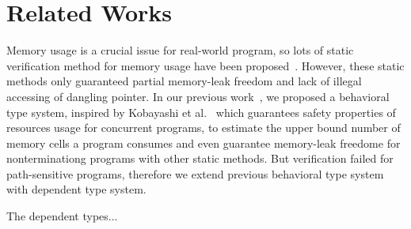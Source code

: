 \section{Related Works}\label{sec:relatedwork}

Memory usage is a crucial issue for real-world program, so lots of
static verification method for memory usage have been
proposed~\cite{DBLP:conf/aplas/SuenagaK09,DBLP:conf/pldi/HeineL03,DBLP:conf/sigsoft/XieA05,DBLP:journals/scp/SwamyHMGJ06,DBLP:conf/sas/OrlovichR06,DBLP:conf/issta/SuiYX12}. However,
these static methods only guaranteed partial memory-leak freedom and
lack of illegal accessing of dangling pointer.  In our previous
work~\cite{}, we proposed a behavioral type system, inspired by
Kobayashi et al.~\cite{DBLP:journals/lmcs/KobayashiSW06} which
guarantees safety properties of resources usage for concurrent
programs, to estimate the upper bound number of memory cells a program
consumes and even guarantee memory-leak freedome for nonterminationg
programs with other static methods. But verification failed for
path-sensitive programs, therefore we extend previous behavioral type
system with dependent type system.

The dependent types...
